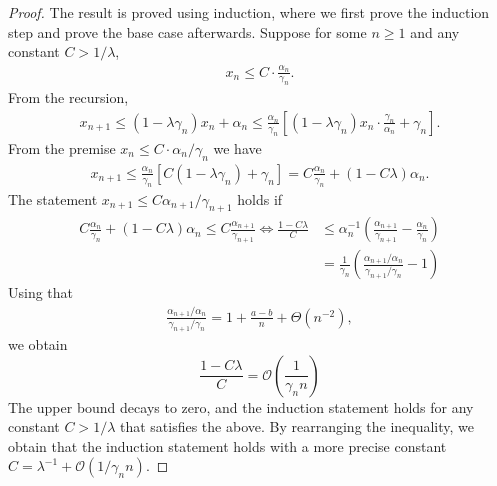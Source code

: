 \documentclass[11pt]{article}
\begin{document}
\begin{proof}
    The result is proved using induction, where we first prove the induction step and prove the base case afterwards. 
    Suppose for some $n \geq 1$ and any constant $C > 1/\lambda$,
    \begin{align*}
        x_{n} \leq C \cdot \frac{\alpha_n}{\gamma_n} . 
    \end{align*}
    From the recursion,
    \begin{align*}
        x_{n+1} \leq (1 - \lambda \gamma_n) x_n + \alpha_n 
        \leq \frac{\alpha_n}{\gamma_n} \left[(1 - \lambda \gamma_n) x_n \cdot \frac{\gamma_n}{\alpha_n} + \gamma_n  \right] .
    \end{align*}
    From the premise $x_n \leq C \cdot  \alpha_n/\gamma_n$ we have
    \begin{align*}
        x_{n+1} \leq  \frac{\alpha_n}{\gamma_n} \left[C(1 - \lambda \gamma_n)  + \gamma_n  \right] 
        = C \frac{\alpha_n}{\gamma_n} + \left(1 - C \lambda \right)\alpha_n 
        .
    \end{align*}
    The statement $x_{n+1} \leq C \alpha_{n+1}/\gamma_{n+1}$ holds if
    \begin{align*}
        C \frac{\alpha_n}{\gamma_n} + \left(1 - C \lambda \right)\alpha_n 
        \leq 
        C\frac{\alpha_{n+1}}{\gamma_{n+1}}
        \Leftrightarrow 
        \frac{1-C\lambda}{C} 
        &\leq 
        \alpha_n^{-1} \left(\frac{\alpha_{n+1}}{\gamma_{n+1}} - \frac{\alpha_n}{\gamma_n} \right)
        \\ &
        =  \frac{1}{\gamma_n} \left(
        \frac{\alpha_{n+1}/\alpha_n}{\gamma_{n+1}/\gamma_n} - 1\right)
    \end{align*}
    Using that
    \begin{align*}
        \frac{\alpha_{n+1}/\alpha_n}{\gamma_{n+1}/\gamma_n} 
        = 1 + \frac{a-b}{n} + \Theta\left(n^{-2} \right), 
    \end{align*}
    we obtain 
    \begin{equation}
        \frac{1 - C \lambda}{C} 
        =
        \mathcal{O}\left(\frac{1}{\gamma_n n} \right)
    \end{equation}
    The upper bound decays to zero, and the induction statement holds for any constant $C > 1/\lambda$ that satisfies the above. 
    By rearranging the inequality, we obtain that the induction statement holds with a more precise constant $C = \lambda^{-1} + \mathcal{O}(1/\gamma_n n)$. 
    


\end{proof}
\end{document}
